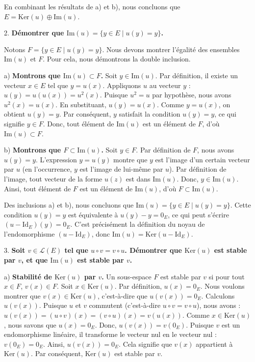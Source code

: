\documentclass{report}
\begin{document}
    En combinant les résultats de a) et b), nous concluons que $E = \text{Ker}(u) \oplus \text{Im}(u)$.

2.  \textbf{Démontrer que $\text{Im}(u) = \{ y \in E \mid u(y) = y \}$.}

    Notons $F = \{ y \in E \mid u(y) = y \}$. Nous devons montrer l'égalité des ensembles $\text{Im}(u)$ et $F$. Pour cela, nous démontrons la double inclusion.

    a) \textbf{Montrons que $\text{Im}(u) \subset F$.}
    Soit $y \in \text{Im}(u)$. Par définition, il existe un vecteur $x \in E$ tel que $y = u(x)$.
    Appliquons $u$ au vecteur $y$ : $u(y) = u(u(x)) = u^2(x)$.
    Puisque $u^2 = u$ par hypothèse, nous avons $u^2(x) = u(x)$.
    En substituant, $u(y) = u(x)$.
    Comme $y = u(x)$, on obtient $u(y) = y$.
    Par conséquent, $y$ satisfait la condition $u(y) = y$, ce qui signifie $y \in F$.
    Donc, tout élément de $\text{Im}(u)$ est un élément de $F$, d'où $\text{Im}(u) \subset F$.

    b) \textbf{Montrons que $F \subset \text{Im}(u)$.}
    Soit $y \in F$. Par définition de $F$, nous avons $u(y) = y$.
    L'expression $y = u(y)$ montre que $y$ est l'image d'un certain vecteur par $u$ (en l'occurrence, $y$ est l'image de lui-même par $u$).
    Par définition de l'image, tout vecteur de la forme $u(z)$ est dans $\text{Im}(u)$.
    Donc, $y \in \text{Im}(u)$.
    Ainsi, tout élément de $F$ est un élément de $\text{Im}(u)$, d'où $F \subset \text{Im}(u)$.

    Des inclusions a) et b), nous concluons que $\text{Im}(u) = \{ y \in E \mid u(y) = y \}$.
    Cette condition $u(y) = y$ est équivalente à $u(y) - y = 0_E$, ce qui peut s'écrire $(u - \text{Id}_E)(y) = 0_E$. C'est précisément la définition du noyau de l'endomorphisme $(u - \text{Id}_E)$, donc $\text{Im}(u) = \text{Ker}(u - \text{Id}_E)$.

3.  \textbf{Soit $v \in \mathcal{L}(E)$ tel que $u \circ v = v \circ u$. Démontrer que $\text{Ker}(u)$ est stable par $v$, et que $\text{Im}(u)$ est stable par $v$.}

    a) \textbf{Stabilité de $\text{Ker}(u)$ par $v$.}
    Un sous-espace $F$ est stable par $v$ si pour tout $x \in F$, $v(x) \in F$.
    Soit $x \in \text{Ker}(u)$. Par définition, $u(x) = 0_E$.
    Nous voulons montrer que $v(x) \in \text{Ker}(u)$, c'est-à-dire que $u(v(x)) = 0_E$.
    Calculons $u(v(x))$. Puisque $u$ et $v$ commutent (c'est-à-dire $u \circ v = v \circ u$), nous avons :
    $u(v(x)) = (u \circ v)(x) = (v \circ u)(x) = v(u(x))$.
    Comme $x \in \text{Ker}(u)$, nous savons que $u(x) = 0_E$.
    Donc, $u(v(x)) = v(0_E)$.
    Puisque $v$ est un endomorphisme linéaire, il transforme le vecteur nul en le vecteur nul : $v(0_E) = 0_E$.
    Ainsi, $u(v(x)) = 0_E$.
    Cela signifie que $v(x)$ appartient à $\text{Ker}(u)$.
    Par conséquent, $\text{Ker}(u)$ est stable par $v$.
\end{document}
